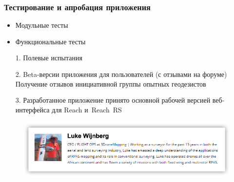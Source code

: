 \documentclass[xetex,с,aspectratio=169]{beamer}
\begin{document}
\begin{frame}
\begin{columns}[T]
\begin{column}{.64\textwidth}
{\begin{figure}[c]
        \end{figure}
      }
    \end{column}
  \end{columns}
\end{frame}


%
%
\begin{frame}
  \frametitle{Тестирование и апробация приложения}
  
  \large
  
  \begin{itemize}
    \setlength\itemsep{0.5em}
    \item Модульные тесты
    \item Функциональные тесты
  \end{itemize}
  \begin{center}
    \vskip -0.5cm
    \color{ifmoblue}{\rule{.5\textwidth}{0.5pt}}
  \end{center}
  \vskip -0.2cm
  \begin{itemize}
    \setlength\itemsep{0.5em}
    \item[1.] Полевые испытания
    \item[2.] Beta-версии приложения для пользователей (с отзывами на форуме)\\
              Получение отзывов инициативной группы опытных геодезистов
    \item[3.] Разработанное приложение принято основной рабочей версией веб-интерфейса для Reach и~Reach~RS
  \end{itemize}
  \vskip -0.2cm
  \begin{figure}[b]
    \centering
    \includegraphics[width=.5\paperwidth]{../img/presentation/luke_wijnberg}
  \end{figure}
\end{frame}
\end{document}
